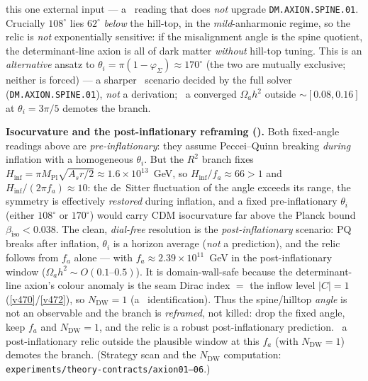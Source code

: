 \documentclass[11pt,a4paper]{article}
\newcommand{\Mpl}{M_{\mathrm{Pl}}}
\begin{document}
this one external input --- a \mC\ reading that does \emph{not} upgrade \texttt{DM.AXION.SPINE.01}.
Crucially $108^\circ$ lies $62^\circ$ \emph{below} the hill-top,
in the \emph{mild}-anharmonic regime, so the relic is \emph{not} exponentially sensitive: if the
misalignment angle is the spine quotient, the determinant-line axion is all of dark matter \emph{without}
hill-top tuning. This is an \emph{alternative} ansatz to $\theta_i=\pi(1-\varphi_\Sigma)\approx170^\circ$
(the two are mutually exclusive; neither is forced) --- a sharper \mC\ scenario decided by the full solver
(\texttt{DM.AXION.SPINE.01}), \emph{not} a derivation; \mX\ a converged $\Omega_a h^2$ outside ${\sim}[0.08,0.16]$
at $\theta_i=3\pi/5$ demotes the branch.

\par\smallskip\noindent\textbf{Isocurvature and the post-inflationary reframing (\mC).}
Both fixed-angle readings above are \emph{pre-inflationary}: they assume Peccei--Quinn breaking
\emph{during} inflation with a homogeneous $\theta_i$. But the $R^2$ branch fixes
$H_{\mathrm{inf}}=\pi\Mpl\sqrt{A_s r/2}\approx1.6\times10^{13}$~GeV, so $H_{\mathrm{inf}}/f_a\approx66>1$
and $H_{\mathrm{inf}}/(2\pi f_a)\approx10$: the de~Sitter fluctuation of the angle exceeds its range, the
symmetry is effectively \emph{restored} during inflation, and a fixed pre-inflationary $\theta_i$ (either
$108^\circ$ or $170^\circ$) would carry CDM isocurvature far above the Planck bound
$\beta_{\mathrm{iso}}<0.038$. The clean, \emph{dial-free} resolution is the \emph{post-inflationary}
scenario: PQ breaks after inflation, $\theta_i$ is a horizon average (\emph{not} a prediction), and the
relic follows from $f_a$ alone --- with $f_a\approx2.39\times10^{11}$~GeV in the post-inflationary window
($\Omega_a h^2\sim O(0.1\text{--}0.5)$). It is domain-wall-safe because the determinant-line axion's colour
anomaly is the seam Dirac index $=$ the inflow level $|C|=1$ (\vref{v470}/\vref{v472}), so
$N_{\mathrm{DW}}=1$ (a \mC\ identification). Thus the spine/hilltop \emph{angle} is not an observable and
the branch is \emph{reframed}, not killed: drop the fixed angle, keep $f_a$ and $N_{\mathrm{DW}}=1$, and the
relic is a robust post-inflationary prediction. \mX\ a post-inflationary relic outside the plausible window
at this $f_a$ (with $N_{\mathrm{DW}}=1$) demotes the branch. (Strategy scan and the $N_{\mathrm{DW}}$
computation: \texttt{experiments/theory-contracts/axion01--06}.)

\end{document}
